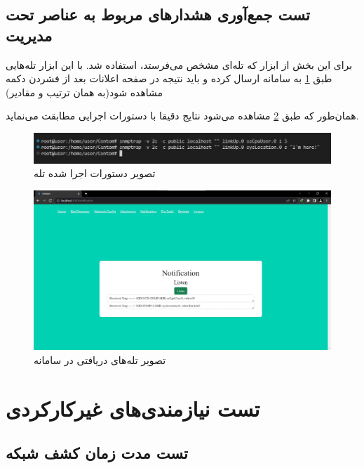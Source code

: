 \cleardoublepage


\subsection{تست جمع‌آوری هشدارهای مربوط به عناصر تحت مدیریت}

برای این بخش از ابزار  که تله‌ای مشخص می‌فرستد، استفاده شد. با این ابزار تله‌هایی طبق \cref{fig.55} به سامانه ارسال کرده و باید نتیجه در صفحه اعلانات بعد از فشردن دکمه مشاهده شود(به همان ترتیب و مقادیر)


همان‌طور که طبق \cref{fig.56} مشاهده می‌شود نتایج دقیقا با دستورات اجرایی مطابقت می‌نماید.


\begin{figure}[!h]
    \centering\includegraphics[scale=.70]{./trap-before}
    \caption{تصویر دستورات اجرا شده تله}\label{fig.55}
\end{figure}

\begin{figure}[!h]
    \centering\includegraphics[scale=.38]{./notification}
    \caption{تصویر تله‌های دریافتی در سامانه}\label{fig.56}
\end{figure}

\cleardoublepage

\section{تست نیازمندی‌های غیرکارکردی}


\subsection{تست مدت زمان کشف شبکه}

